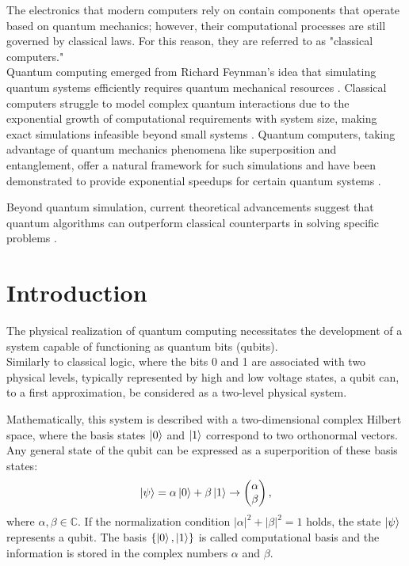 The electronics that modern computers rely on contain components that operate based on quantum mechanics; however, their computational processes are still governed by classical laws. 
For this reason, they are referred to as "classical computers."\\

Quantum computing emerged from Richard Feynman’s idea that simulating quantum systems efficiently requires quantum mechanical resources \cite{Feynman1982}. 
Classical computers struggle to model complex quantum interactions due to the exponential growth of computational requirements with system size, making exact simulations infeasible beyond small systems \cite{Brown2010}. 
Quantum computers, taking advantage of quantum mechanics phenomena like superposition and entanglement, offer a natural framework for such simulations and have been demonstrated to provide exponential speedups for certain quantum systems \cite{Georgescu_2014}.

Beyond quantum simulation, current theoretical advancements suggest that quantum algorithms can outperform classical counterparts in solving specific problems \cite{Montanaro2016}.

\section{Introduction}
The physical realization of quantum computing necessitates the development of a system capable of functioning as quantum bits (qubits).\\
Similarly to classical logic, where the bits 0 and 1 are associated with two physical levels, typically represented by high and low voltage states, a qubit can, to a first approximation, be considered as a two-level physical system.

Mathematically, this system is described with a two-dimensional complex Hilbert space, where the basis states $\ket{0}$ and $\ket{1}$ correspond to two orthonormal vectors.
Any general state of the qubit can be expressed as a superporition of these basis states:
\begin{equation}\label{eq:qubit}
    \ket{\psi} = \alpha\ket{0} + \beta\ket{1} \rightarrow \begin{pmatrix} 
        \alpha \\ 
        \beta 
        \end{pmatrix},
\end{equation}
where $\alpha,\beta\in \mathbb{C}$. If the normalization condition $|\alpha|^2 +|\beta|^2 =1$ holds, the state $\ket{\psi}$ represents a qubit.
The basis $\{\ket{0},\ket{1}\}$ is called computational basis and the information is stored in the complex numbers $\alpha$ and $\beta$.

